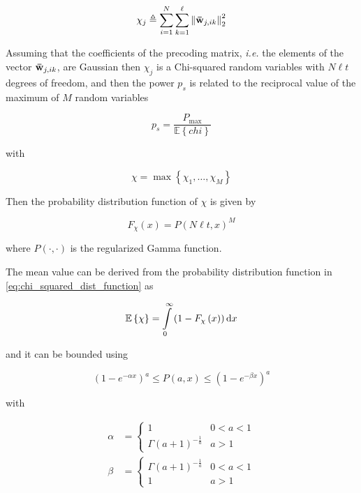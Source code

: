\begin{equation} \label{eq:chi_squared_j}
    \chi_j \triangleq \sum\limits_{i = 1}^N \sum\limits_{k = 1}^\ell \left\|
    \mathbf{\bar{w}}_{j, ik} \right\|_2^2
\end{equation}

Assuming that the coefficients of the precoding matrix, \emph{i.e.} the elements
of the vector $\mathbf{\bar{w}}_{j, ik}$, are Gaussian then $\chi_j$ is a Chi-squared
random variables with $N\ell t$ degrees of freedom, and then the power $p_s$ is
related to the reciprocal value of the maximum of $M$ random variables

\begin{equation} \label{eq:ps_reciprocal}
    p_s = \frac{P_{\max}}{\mathbb{E}\left\{chi\right\}}
\end{equation}

\noindent
with

\begin{equation} \label{eq:chi_squared}
    \chi = \max\left\{\chi_1, \ldots, \chi_M\right\}
\end{equation}

Then the probability distribution function of $\chi$ is given by

\begin{equation} \label{eq:chi_squared_dist_function}
    F_{\chi}\left(x\right) = P\left(N\ell t, x\right)^M
\end{equation}

\noindent
where $P\left(\cdot,\cdot\right)$ is the regularized Gamma function.

The mean value can be derived from the probability distribution function in
\eqref{eq:chi_squared_dist_function} as

\begin{equation} \label{eq:chi_squared_mean}
    \mathbb{E}\left\{\chi\right\} = \int\limits_0^\infty \left( 1 - F_{\chi}
    \left(x\right)\right) \text{d} x
\end{equation}

\noindent
and it can be bounded using

\begin{equation} \label{eq:bound_reg_gamma}
    \left(1 - e^{-\alpha x}\right)^a \leq P\left(a,x\right) \leq
    \left(1 - e^{-\beta x}\right)^a
\end{equation}

\noindent
with

\begin{equation} \label{eq:bound_parameters}
\begin{aligned}
    \alpha &= \begin{cases}
    1 & 0 < a < 1 \\
    \Gamma\left(a + 1\right)^{-\frac{1}{a}} & a > 1
    \end{cases} \\
    \beta &= \begin{cases}
    \Gamma\left(a + 1\right)^{-\frac{1}{a}} & 0 < a < 1 \\
    1 & a > 1
    \end{cases}
\end{aligned}
\end{equation}


